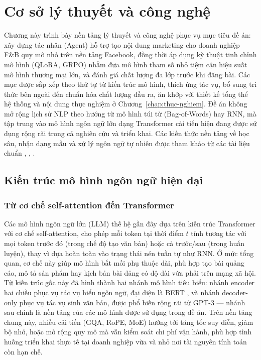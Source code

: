 \chapter{Cơ sở lý thuyết và công nghệ}\label{chap:ly-thuyet}

Chương này trình bày nền tảng lý thuyết và công nghệ phục vụ mục tiêu đề án: xây dựng tác nhân (Agent) hỗ trợ tạo nội dung marketing cho doanh
nghiệp F\&B quy mô nhỏ trên nền tảng Facebook, đồng thời áp dụng kỹ
thuật tinh chỉnh mô hình (QLoRA, GRPO) nhằm đưa mô hình tham số nhỏ
tiệm cận hiệu suất mô hình thương mại lớn, và đánh giá chất lượng đa lớp
trước khi đăng bài. Các mục được sắp xếp theo thứ tự từ kiến trúc mô
hình, thích ứng tác vụ, bổ sung tri thức bên ngoài đến chuẩn hóa chất
lượng đầu ra, ăn khớp với thiết kế tổng thể hệ thống và nội dung thực
nghiệm ở Chương~\ref{chap:thuc-nghiem}. Đề án không mở rộng lịch sử
NLP theo hướng từ mô hình túi từ (Bag-of-Words) hay RNN, mà tập trung
vào mô hình ngôn ngữ lớn dạng Transformer cải tiến hiện đang được sử dụng
rộng rãi trong cả nghiên cứu và triển khai. Các kiến thức nền tảng về học
sâu, nhận dạng mẫu và xử lý ngôn ngữ tự nhiên được tham khảo từ các tài
liệu chuẩn , ,
.

\section{Kiến trúc mô hình ngôn ngữ hiện đại}\label{sec:llm-kiem-truc}

\subsection{Từ cơ chế self-attention đến Transformer}

Các mô hình ngôn ngữ lớn (LLM) thế hệ gần đây dựa trên kiến trúc
Transformer  với cơ chế self-attention, cho phép mỗi token
tại thời điểm $t$ tính tương tác với mọi token trước đó (trong chế độ
tạo văn bản) hoặc cả trước/sau (trong huấn luyện), thay vì dựa hoàn toàn
vào trạng thái nén tuần tự như RNN. Ở mức tổng quan, cơ chế này giúp mô
hình bắt mối phụ thuộc dài, phù hợp tạo bài quảng cáo, mô tả sản phẩm
hay kịch bản bài đăng có độ dài vừa phải trên mạng xã hội. Từ kiến trúc
gốc này đã hình thành hai nhánh mô hình tiêu biểu: nhánh encoder hai
chiều phục vụ tác vụ hiểu ngôn ngữ, đại diện là BERT
, và nhánh decoder-only phục vụ tác vụ sinh văn
bản, được phổ biến rộng rãi từ GPT-3  --- nhánh
sau chính là nền tảng của các mô hình được sử dụng trong đề án. Trên nền tảng
chung này, nhiều cải tiến (GQA, RoPE, MoE) hướng tới tăng tốc suy diễn,
giảm bộ nhớ, hoặc mở rộng quy mô mà vẫn kiểm soát chi phí vận hành,
phù hợp tình huống triển khai thực tế tại doanh nghiệp vừa và nhỏ nơi
tài nguyên tính toán còn hạn chế.

